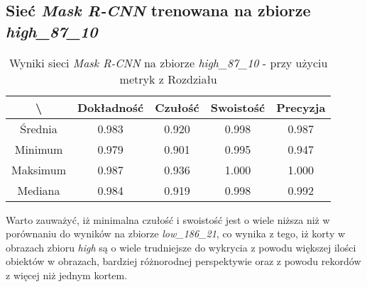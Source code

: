 \subsection{Sieć \textit{Mask R-CNN} trenowana na zbiorze \textit{high\_87\_10}}
\label{sec:results_high_original}

\begin{table}[H]
	\centering
	\caption{Wyniki sieci \textit{Mask R-CNN} na zbiorze \textit{high\_87\_10} - przy użyciu metryk z Rozdziału }
	\vspace{6pt}
	{\footnotesize
		\begin{tabular}{|c|c|c|c|c|}
      \hline \textbackslash & Dokładność & Czułość & Swoistość & Precyzja \\
      \hline Średnia & 0.983 & 0.920 & 0.998 & 0.987 \\
      \hline Minimum & 0.979 & 0.901 & 0.995 & 0.947 \\
      \hline Maksimum & 0.987 & 0.936 & 1.000 & 1.000 \\
      \hline Mediana & 0.984 & 0.919 & 0.998 & 0.992 \\
      \hline
		\end{tabular}
	}
  \vspace{0pt}
  \label{Tab:high_original_calculated}
\end{table}

Warto zauważyć, iż minimalna czułość i swoistość jest o wiele niższa niż w porównaniu do wyników na zbiorze \textit{low\_186\_21}, co wynika z tego, iż korty w obrazach zbioru \textit{high} są o wiele trudniejsze do wykrycia z powodu większej ilości obiektów w obrazach, bardziej różnorodnej perspektywie oraz z powodu rekordów z więcej niż jednym kortem.
